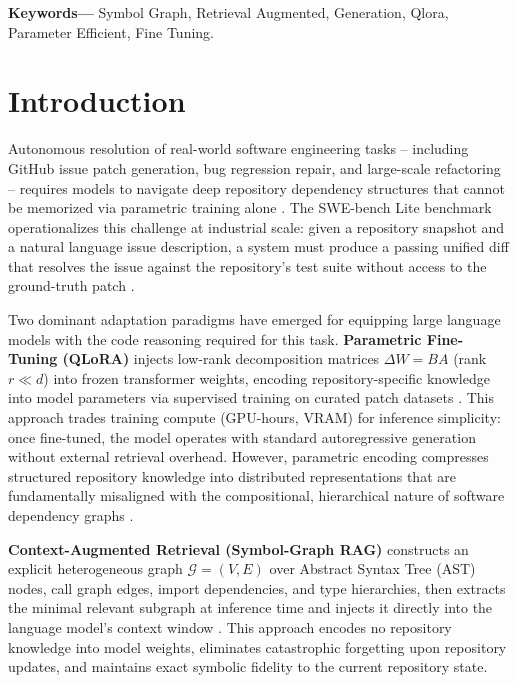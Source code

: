 \documentclass[10pt,twocolumn,letterpaper]{article}
\begin{document}
\noindent\textbf{Keywords---} Symbol Graph, Retrieval Augmented, Generation, Qlora, Parameter Efficient, Fine Tuning.







\section{Introduction}


Autonomous resolution of real-world software engineering tasks -- including GitHub issue patch generation, bug regression repair, and large-scale refactoring -- requires models to navigate deep repository dependency structures that cannot be memorized via parametric training alone \cite{arxiv_2405_01543,arxiv_2501_02842}. The SWE-bench Lite benchmark operationalizes this challenge at industrial scale: given a repository snapshot and a natural language issue description, a system must produce a passing unified diff that resolves the issue against the repository's test suite without access to the ground-truth patch \cite{arxiv_2203_02155}.

Two dominant adaptation paradigms have emerged for equipping large language models with the code reasoning required for this task. \textbf{Parametric Fine-Tuning (QLoRA)} injects low-rank decomposition matrices $\Delta W = BA$ (rank $r \ll d$) into frozen transformer weights, encoding repository-specific knowledge into model parameters via supervised training on curated patch datasets \cite{arxiv_2305_18290,arxiv_2208_14227}. This approach trades training compute (GPU-hours, VRAM) for inference simplicity: once fine-tuned, the model operates with standard autoregressive generation without external retrieval overhead. However, parametric encoding compresses structured repository knowledge into distributed representations that are fundamentally misaligned with the compositional, hierarchical nature of software dependency graphs \cite{arxiv_2406_00584}.

\textbf{Context-Augmented Retrieval (Symbol-Graph RAG)} constructs an explicit heterogeneous graph $\mathcal{G} = (V, E)$ over Abstract Syntax Tree (AST) nodes, call graph edges, import dependencies, and type hierarchies, then extracts the minimal relevant subgraph at inference time and injects it directly into the language model's context window \cite{crossref_10_1145_3689096_3689462,crossref_10_18653_v1_2026_findings_acl_1933}. This approach encodes no repository knowledge into model weights, eliminates catastrophic forgetting upon repository updates, and maintains exact symbolic fidelity to the current repository state.
\end{document}
